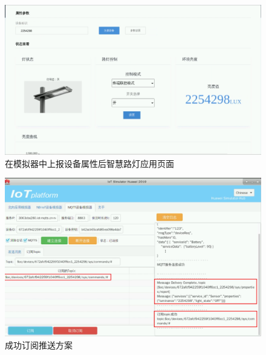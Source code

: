\begin{figure}[!htbp]
\centering
\includegraphics[width=\textwidth]{figures/序列 01.00_19_46_52.Still014.png}
\caption{在模拟器中上报设备属性后智慧路灯应用页面}\label{在模拟器中上报设备属性后智慧路灯应用页面}
\end{figure}

\begin{figure}[!htbp]
\centering
\includegraphics[width=\textwidth]{figures/序列 01.00_20_37_51.Still015.png}
\caption{成功订阅推送方案}\label{成功订阅推送方案}
\end{figure}

